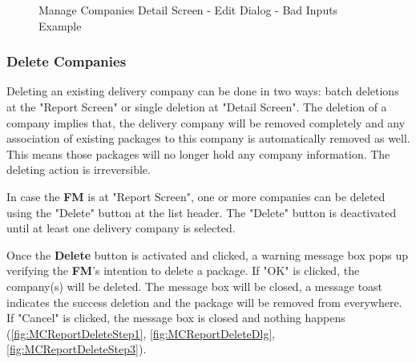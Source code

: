 \begin{figure}[H]
	\centering
    \vspace{5pt}
    \hspace{5pt}
    \caption{Manage Companies Detail Screen - Edit Dialog - Bad Inputs Example}
	\label{fig:MCDetailEditDlgBad}
\end{figure}

\subsubsection{Delete Companies}

Deleting an existing delivery company can be done in two ways: batch deletions at the "Report Screen" or single deletion at "Detail Screen". The deletion of a company implies that, the delivery company will be removed completely and any association of existing packages to this company is automatically removed as well. This means those packages will no longer hold any company information. The deleting action is irreversible. 

In case the \textbf{FM} is at "Report Screen", one or more companies can be deleted using the "Delete" button at the list header. The "Delete" button is deactivated until at least one delivery company is selected.

Once the \textbf{Delete} button is activated and clicked, a warning message box pops up verifying the \textbf{FM}'s intention to delete a package. If "OK" is clicked, the company(s) will be deleted. The message box will be closed, a message toast indicates the success deletion and the package will be removed from everywhere. If "Cancel" is clicked, the message box is closed and nothing happens (\autoref{fig:MCReportDeleteStep1}, \autoref{fig:MCReportDeleteDlg}, 
\autoref{fig:MCReportDeleteStep3}).


